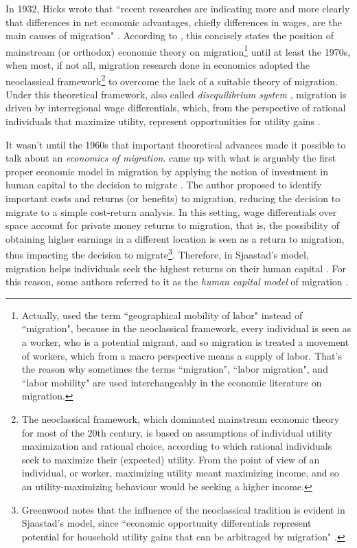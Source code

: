 In 1932, Hicks wrote that ``recent researches are indicating more and more clearly that differences in net economic advantages, chiefly differences in wages, are the main causes of migration" \citep[p. 76]{hicks_theory_1932}. According to \cite{greenwood_research_1975}, this concisely states the position of mainstream (or orthodox) economic theory on migration\footnote{Actually, \cite{greenwood_research_1975} used the term ``geographical mobility of labor" instead of ``migration", because in the neoclassical framework, every individual is seen as a worker, who is a potential migrant, and so migration is treated a movement of workers, which from a macro perspective means a supply of labor. That's the reason why sometimes the terms ``migration", ``labor migration", and ``labor mobility" are used interchangeably in the economic literature on migration.} until at least the 1970s, when most, if not all, migration research done in economics adopted the neoclassical framework\footnote{The neoclassical framework, which dominated mainstream economic theory for most of the 20th century, is based on assumptions of individual utility maximization and rational choice, according to which rational individuals seek to maximize their (expected) utility. From the point of view of an individual, or worker, maximizing utility meant maximizing income, and so an utility-maximizing behaviour would be seeking a higher income.} to overcome the lack of a suitable theory of migration. Under this theoretical framework, also called \textit{disequilibrium system} \citep{greenwood_internal_1997}, migration is driven by interregional wage differentials, which, from the perspective of rational individuals that maximize utility, represent opportunities for utility gains \citep{greenwood_research_1975, lucas_internal_1997, greenwood_internal_1997}.

It wasn't until the 1960s that important theoretical advances made it possible to talk about an \textit{economics of migration}. \cite{sjaastad_costs_1962} came up with what is arguably the first proper economic model in migration by applying the notion of investment in human capital to the decision to migrate \citep{greenwood_internal_1997}. The author proposed to identify important costs and returns (or benefits) to migration, reducing the decision to migrate to a simple cost-return analysis. In this setting, wage differentials over space account for private money returns to migration, that is, the possibility of obtaining higher earnings in a different location is seen as a return to migration, thus impacting the decision to migrate\footnote{Greenwood notes that the influence of the neoclassical tradition is evident in Sjaastad's model, since ``economic opportunity differentials represent potential for household utility gains that can be arbitraged by migration" \citep[p. 670]{greenwood_internal_1997}.}. Therefore, in Sjaastad's model, migration helps individuals seek the highest returns on their human capital \citep{sjaastad_costs_1962}. For this reason, some authors referred to it as the \textit{human capital model} of migration \citep{shields_emergence_1989, greenwood_internal_1997}.

